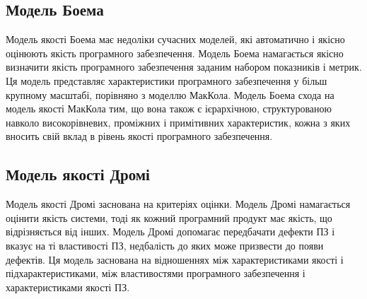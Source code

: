 \documentclass[a4paper,oneside,DIV=12,12pt]{scrartcl}
\begin{document}
		\subsection{Модель Боема}
			Модель якості Боема має недоліки сучасних моделей, які автоматично і якісно оцінюють якість програмного забезпечення. Модель Боема намагається якісно визначити якість програмного забезпечення заданим набором показників і метрик. Ця модель представляє характеристики програмного забезпечення у більш крупному масштабі, порівняно з моделлю МакКола. Модель Боема схода на модель якості МакКола тим, що вона також є ієрархічною, структурованою навколо високорівневих, проміжних і примітивних характеристик, кожна з яких вносить свій вклад в рівень якості програмного забезпечення.
			
		\subsection{Модель якості Дромі}
			Модель якості Дромі заснована на критеріях оцінки. Модель Дромі намагається оцінити якість системи, тоді як кожний програмний продукт має якість, що відрізняється від інших. Модель Дромі допомагає передбачати дефекти ПЗ і вказує на ті властивості ПЗ, недбалість до яких може призвести до появи дефектів. Ця модель заснована на відношеннях між характеристиками якості і підхарактеристиками, між властивостями програмного забезпечення і характеристиками якості ПЗ.
\end{document}
